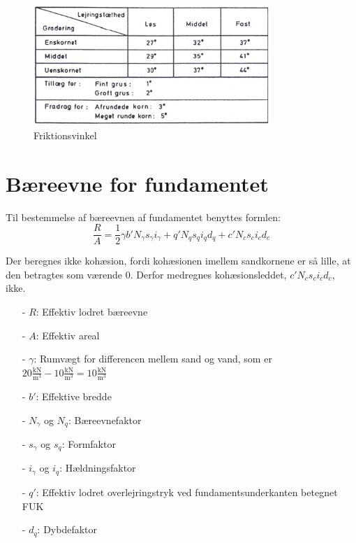 \begin{figure}[htbp]
	\centering
	\includegraphics[width=0.8\textwidth]{billeder/friktionsvinkel.png}
	\caption{Friktionsvinkel \citep[ s. 170]{geoteknik}}
	\label{fig:friktionsvinkel}
\end{figure}

\section{Bæreevne for fundamentet}
Til bestemmelse af bæreevnen af fundamentet benyttes formlen:
\begin{equation}
	\frac{R}{A} = \frac{1}{2} \gamma  b' N_\gamma s_\gamma i_\gamma + q' N_q s_q i_q d_q + c' N_c s_c i_c d_c
\end{equation}

Der beregnes ikke kohæsion, fordi kohæsionen imellem sandkornene er så lille, at den betragtes som værende 0. Derfor medregnes kohæsionsleddet, $c'N_c s_c i_c d_c$, ikke.

\begin{itemize}
	\item[-] $R$: Effektiv lodret bæreevne
	\item[-] $A$: Effektiv areal
	\item[-] $\gamma$: Rumvægt for differencen mellem sand og vand, som er $20\frac{\text{kN}}{\text{m}^3} - 10\frac{\text{kN}}{\text{m}^3} = 10\frac{\text{kN}}{\text{m}^3}$
	\item[-] $b'$: Effektive bredde
	\item[-] $N_{\gamma}$ og $N_q$: Bæreevnefaktor
	\item[-] $s_\gamma$ og $s_q$: Formfaktor
	\item[-] $i_\gamma$ og $i_q$: Hældningsfaktor
	\item[-] $q'$: Effektiv lodret overlejringstryk ved fundamentsunderkanten betegnet FUK
	\item[-] $d_q$: Dybdefaktor
\end{itemize}

